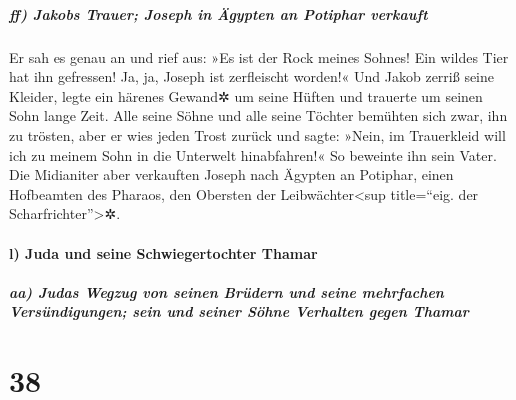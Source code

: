\hypertarget{ff-jakobs-trauer-joseph-in-uxe4gypten-an-potiphar-verkauft}{%
\subparagraph{ff) Jakobs Trauer; Joseph in Ägypten an Potiphar
verkauft}\label{ff-jakobs-trauer-joseph-in-uxe4gypten-an-potiphar-verkauft}}

 Er sah es genau an und rief aus: »Es ist der Rock meines
Sohnes! Ein wildes Tier hat ihn gefressen! Ja, ja, Joseph ist
zerfleischt worden!«  Und Jakob zerriß seine Kleider,
legte ein härenes Gewand✲ um seine Hüften und trauerte um seinen Sohn
lange Zeit.  Alle seine Söhne und alle seine Töchter
bemühten sich zwar, ihn zu trösten, aber er wies jeden Trost zurück und
sagte: »Nein, im Trauerkleid will ich zu meinem Sohn in die Unterwelt
hinabfahren!« So beweinte ihn sein Vater.  Die Midianiter
aber verkauften Joseph nach Ägypten an Potiphar, einen Hofbeamten des
Pharaos, den Obersten der Leibwächter\textless sup title=``eig. der
Scharfrichter''\textgreater✲.

\hypertarget{l-juda-und-seine-schwiegertochter-thamar}{%
\paragraph{l) Juda und seine Schwiegertochter
Thamar}\label{l-juda-und-seine-schwiegertochter-thamar}}

\hypertarget{aa-judas-wegzug-von-seinen-bruxfcdern-und-seine-mehrfachen-versuxfcndigungen-sein-und-seiner-suxf6hne-verhalten-gegen-thamar}{%
\subparagraph{aa) Judas Wegzug von seinen Brüdern und seine mehrfachen
Versündigungen; sein und seiner Söhne Verhalten gegen
Thamar}\label{aa-judas-wegzug-von-seinen-bruxfcdern-und-seine-mehrfachen-versuxfcndigungen-sein-und-seiner-suxf6hne-verhalten-gegen-thamar}}

\hypertarget{section-37}{%
\section{38}\label{section-37}}

